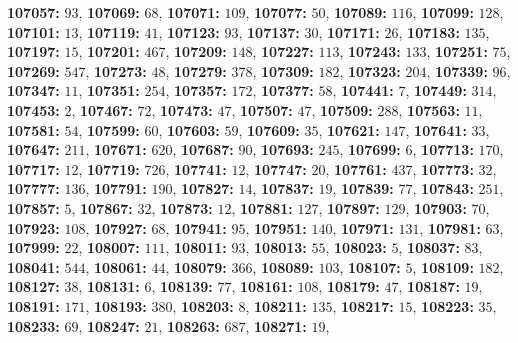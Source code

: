 \textsf{\bfseries 107057:} $93$, \textsf{\bfseries 107069:} $68$, \textsf{\bfseries 107071:} $109$, \textsf{\bfseries 107077:} $50$, \textsf{\bfseries 107089:} $116$, \textsf{\bfseries 107099:} $128$, \textsf{\bfseries 107101:} $13$, \textsf{\bfseries 107119:} $41$, \textsf{\bfseries 107123:} $93$, \textsf{\bfseries 107137:} $30$, \textsf{\bfseries 107171:} $26$, \textsf{\bfseries 107183:} $135$, \textsf{\bfseries 107197:} $15$, \textsf{\bfseries 107201:} $467$, \textsf{\bfseries 107209:} $148$, \textsf{\bfseries 107227:} $113$, \textsf{\bfseries 107243:} $133$, \textsf{\bfseries 107251:} $75$, \textsf{\bfseries 107269:} $547$, \textsf{\bfseries 107273:} $48$, \textsf{\bfseries 107279:} $378$, \textsf{\bfseries 107309:} $182$, \textsf{\bfseries 107323:} $204$, \textsf{\bfseries 107339:} $96$, \textsf{\bfseries 107347:} $11$, \textsf{\bfseries 107351:} $254$, \textsf{\bfseries 107357:} $172$, \textsf{\bfseries 107377:} $58$, \textsf{\bfseries 107441:} $7$, \textsf{\bfseries 107449:} $314$, \textsf{\bfseries 107453:} $2$, \textsf{\bfseries 107467:} $72$, \textsf{\bfseries 107473:} $47$, \textsf{\bfseries 107507:} $47$, \textsf{\bfseries 107509:} $288$, \textsf{\bfseries 107563:} $11$, \textsf{\bfseries 107581:} $54$, \textsf{\bfseries 107599:} $60$, \textsf{\bfseries 107603:} $59$, \textsf{\bfseries 107609:} $35$, \textsf{\bfseries 107621:} $147$, \textsf{\bfseries 107641:} $33$, \textsf{\bfseries 107647:} $211$, \textsf{\bfseries 107671:} $620$, \textsf{\bfseries 107687:} $90$, \textsf{\bfseries 107693:} $245$, \textsf{\bfseries 107699:} $6$, \textsf{\bfseries 107713:} $170$, \textsf{\bfseries 107717:} $12$, \textsf{\bfseries 107719:} $726$, \textsf{\bfseries 107741:} $12$, \textsf{\bfseries 107747:} $20$, \textsf{\bfseries 107761:} $437$, \textsf{\bfseries 107773:} $32$, \textsf{\bfseries 107777:} $136$, \textsf{\bfseries 107791:} $190$, \textsf{\bfseries 107827:} $14$, \textsf{\bfseries 107837:} $19$, \textsf{\bfseries 107839:} $77$, \textsf{\bfseries 107843:} $251$, \textsf{\bfseries 107857:} $5$, \textsf{\bfseries 107867:} $32$, \textsf{\bfseries 107873:} $12$, \textsf{\bfseries 107881:} $127$, \textsf{\bfseries 107897:} $129$, \textsf{\bfseries 107903:} $70$, \textsf{\bfseries 107923:} $108$, \textsf{\bfseries 107927:} $68$, \textsf{\bfseries 107941:} $95$, \textsf{\bfseries 107951:} $140$, \textsf{\bfseries 107971:} $131$, \textsf{\bfseries 107981:} $63$, \textsf{\bfseries 107999:} $22$, \textsf{\bfseries 108007:} $111$, \textsf{\bfseries 108011:} $93$, \textsf{\bfseries 108013:} $55$, \textsf{\bfseries 108023:} $5$, \textsf{\bfseries 108037:} $83$, \textsf{\bfseries 108041:} $544$, \textsf{\bfseries 108061:} $44$, \textsf{\bfseries 108079:} $366$, \textsf{\bfseries 108089:} $103$, \textsf{\bfseries 108107:} $5$, \textsf{\bfseries 108109:} $182$, \textsf{\bfseries 108127:} $38$, \textsf{\bfseries 108131:} $6$, \textsf{\bfseries 108139:} $77$, \textsf{\bfseries 108161:} $108$, \textsf{\bfseries 108179:} $47$, \textsf{\bfseries 108187:} $19$, \textsf{\bfseries 108191:} $171$, \textsf{\bfseries 108193:} $380$, \textsf{\bfseries 108203:} $8$, \textsf{\bfseries 108211:} $135$, \textsf{\bfseries 108217:} $15$, \textsf{\bfseries 108223:} $35$, \textsf{\bfseries 108233:} $69$, \textsf{\bfseries 108247:} $21$, \textsf{\bfseries 108263:} $687$, \textsf{\bfseries 108271:} $19$, 
